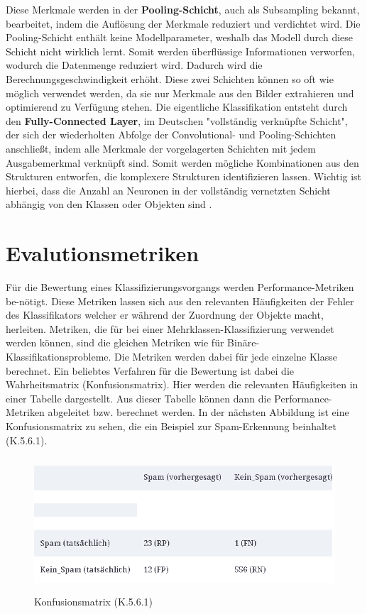 \documentclass[12pt]{scrreprt}
\begin{document}
Diese Merkmale werden in der \textbf{Pooling-Schicht}, auch als Subsampling bekannt, bearbeitet, indem die Auflösung der Merkmale reduziert und verdichtet wird. Die Pooling-Schicht enthält keine Modellparameter, weshalb das Modell durch diese Schicht nicht wirklich lernt. Somit werden überflüssige Informationen verworfen, wodurch die Datenmenge reduziert wird. Dadurch wird die Berechnungsgeschwindigkeit erhöht. Diese zwei Schichten können so oft wie möglich verwendet werden, da sie nur Merkmale aus den Bilder extrahieren und optimierend zu Verfügung stehen. Die eigentliche Klassifikation entsteht durch den \textbf{Fully-Connected Layer}, im Deutschen "vollständig verknüpfte Schicht", der sich der wiederholten Abfolge der Convolutional- und Pooling-Schichten anschließt, indem alle Merkmale der vorgelagerten Schichten mit jedem Ausgabemerkmal verknüpft sind. Somit werden mögliche Kombinationen aus den Strukturen entworfen, die komplexere Strukturen identifizieren lassen. Wichtig ist hierbei, dass die Anzahl an Neuronen in der vollständig vernetzten Schicht abhängig von den Klassen oder Objekten sind \cite{Luber2019}. 
	
\section{Evalutionsmetriken}
	
Für die Bewertung eines Klassifizierungsvorgangs werden Performance-Metriken be-nötigt. Diese Metriken lassen sich aus den relevanten Häufigkeiten der Fehler des Klassifikators welcher er während der Zuordnung der Objekte macht, herleiten. Metriken, die für bei einer Mehrklassen-Klassifizierung verwendet werden können, sind die gleichen Metriken wie für Binäre-Klassifikationsprobleme. Die Metriken werden dabei für jede einzelne Klasse berechnet. Ein beliebtes Verfahren für die Bewertung ist dabei die Wahrheitsmatrix (Konfusionsmatrix). Hier werden die relevanten Häufigkeiten in einer Tabelle dargestellt. Aus dieser Tabelle können dann die Performance-Metriken abgeleitet bzw. berechnet werden. In der nächsten Abbildung ist eine Konfusionsmatrix zu sehen, die ein Beispiel zur Spam-Erkennung beinhaltet \cite{Burkov2019} (K.5.6.1).

\begin{figure}[h!]
	\centering
	\includegraphics[width=12cm,height=5cm]		{Wahrheitsmatrix.png}
	\caption{Konfusionsmatrix  \cite{Burkov2019}(K.5.6.1)}
	\label{fig:fig21}
\end{figure}
\end{document}

